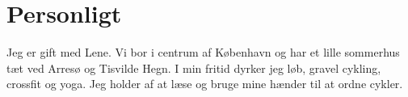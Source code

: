 \documentclass[10pt, a4paper]{article}
\begin{document}

\section{Personligt}
Jeg er gift med Lene. Vi bor i centrum af København og har et lille sommerhus tæt ved Arresø og Tisvilde Hegn. I min fritid dyrker jeg løb, gravel cykling, crossfit og yoga. Jeg holder af at læse og bruge mine hænder til at ordne cykler. 
\end{document}
